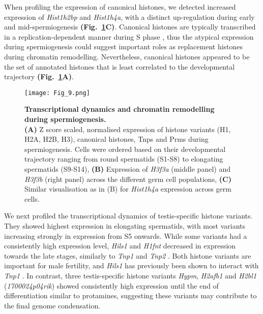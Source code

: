 When profiling the expression of canonical histones, we detected increased expression of \textit{Hist1h2bp} and \textit{Hist1h4a}, with a distinct up-regulation during early and mid-spermiogenesis \textbf{(Fig.~\ref{fig3:spermiogenesis}C)}. Canonical histones are typically transcribed in a replication-dependent manner during S phase \citep{Marzluff2002}, thus the atypical expression during spermiogenesis could suggest important roles as replacement histones during chromatin remodelling. Nevertheless, canonical histones appeared to be the set of annotated histones that is least correlated to the developmental trajectory \textbf{(Fig.~\ref{fig3:spermiogenesis}A)}.

\newpage

\begin{figure}[!h]
\centering
\texttt{[image: Fig\_9.png]}
\caption[Transcriptional dynamics and chromatin remodelling during spermiogenesis]{\textbf{Transcriptional dynamics and chromatin remodelling during spermiogenesis.} \\
\textbf{(A)} Z score scaled, normalised expression of histone variants (H1, H2A, H2B, H3), canonical histones, \glspl{Tnp} and \glspl{Prm} during spermiogenesis. Cells were ordered based on their developmental trajectory ranging from round spermatids (S1-S8) to elongating spermatids (S9-S14), \textbf{(B)} Expression of \textit{H3f3a} (middle panel) and \textit{H3f3b} (right panel) across the different germ cell populations, \textbf{(C)} Similar visualisation as in (B) for \textit{Hist1h4a} expression across germ cells. }
\label{fig3:spermiogenesis}
\end{figure}

\newpage

We next profiled the transcriptional dynamics of testis-specific histone variants. They showed highest expression in elongating spermatids, with most variants increasing strongly in expression from S5 onwards. While some variants had a consistently high expression level, \textit{Hils1} and \textit{H1fnt} decreased in expression towards the late stages, similarly to \textit{Tnp1} and \textit{Tnp2} \citep{Zhao2004}. Both histone variants are important for male fertility, and \textit{Hils1} has previously been shown to interact with \textit{Tnp1} \citep{Tanaka2005}. In contrast, three testis-specific histone variants \textit{Hypm}, \textit{H2afb1} and \textit{H2bl1} (\textit{1700024p04rik}) showed consistently high expression until the end of differentiation similar to protamines, suggesting these variants may contribute to the final genome condensation.


